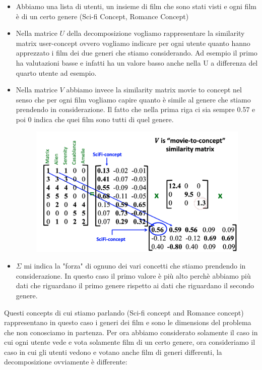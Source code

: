 \documentclass[14pt]{extreport}
\begin{document}
\begin{itemize}
	\item Abbiamo una lista di utenti, un insieme di film che sono stati visti e ogni film è di un certo genere (Sci-fi Concept, Romance Concept)
	\item Nella matrice $U$ della decomposizione vogliamo rappresentare la similarity matrix user-concept ovvero vogliamo indicare per ogni utente quanto
	hanno apprezzato i film dei due generi che stiamo considerando. Ad esempio il primo ha valutazioni basse e infatti ha un valore basso anche nella U a differenza del 	
	quarto utente ad esempio.
	\item Nella matrice $V$ abbiamo invece la similarity matrix movie to concept nel senso che per ogni film vogliamo capire quanto è simile al genere che stiamo prendendo 
	in considerazione. Il fatto che nella prima riga ci sia sempre 0.57 e poi 0 indica che quei film sono tutti di quel genere.

	\begin{figure}[H] 
	\centering
	\includegraphics[width=0.7\linewidth]{500.jpeg}
	\end{figure}

	\item $\Sigma$ mi indica la "forza" di ognuno dei vari concetti che stiamo prendendo in considerazione. In questo caso il primo valore è più alto perchè abbiamo più 
	dati che riguardano il primo genere rispetto ai dati che riguardano il secondo genere.
\end{itemize}

Questi concepts di cui stiamo parlando (Sci-fi concept and Romance concept) rappresentano in questo caso i generi dei film e sono le dimensions del problema che non conosciamo
in partenza.
Per ora abbiamo considerato solamente il caso in cui ogni utente vede e vota solamente film di un certo genere, ora consideriamo il caso in cui gli utenti vedono
e votano anche film di generi differenti, la decomposizione ovviamente è differente:
\end{document}
